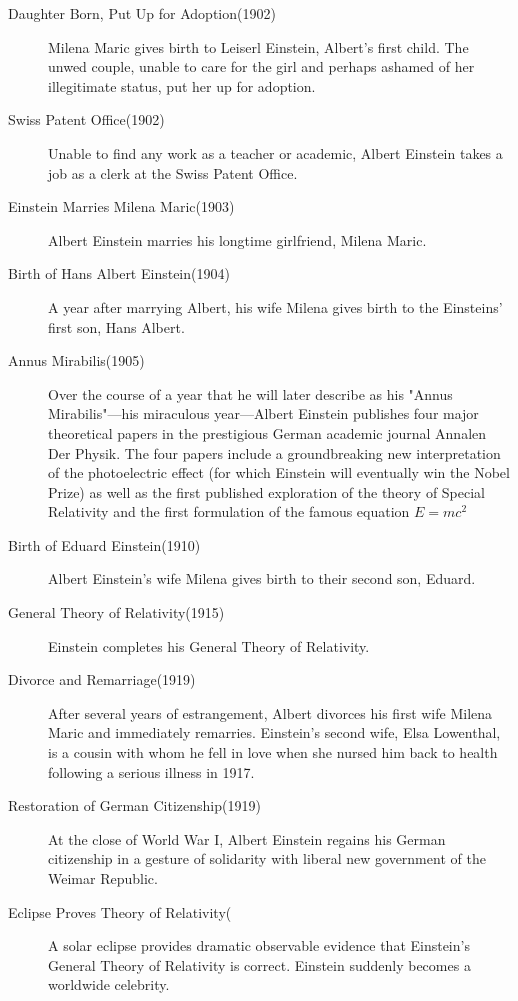 \documentclass{article}
\begin{document}
\begin{description}
\item[Daughter Born, Put Up for Adoption(1902)]
Milena Maric gives birth to Leiserl Einstein, Albert's first child. The unwed couple, unable to care for the girl and perhaps ashamed of her illegitimate status, put her up for adoption.

\item[Swiss Patent Office(1902)]
Unable to find any work as a teacher or academic, Albert Einstein takes a job as a clerk at the Swiss Patent Office.

\item[Einstein Marries Milena Maric(1903)]
Albert Einstein marries his longtime girlfriend, Milena Maric.

\item[Birth of Hans Albert Einstein(1904)]
A year after marrying Albert, his wife Milena gives birth to the Einsteins' first son, Hans Albert.

\item[Annus Mirabilis(1905)]
Over the course of a year that he will later describe as his "Annus Mirabilis"—his miraculous year—Albert Einstein publishes four major theoretical papers in the prestigious German academic journal Annalen Der Physik. The four papers include a groundbreaking new interpretation of the photoelectric effect (for which Einstein will eventually win the Nobel Prize) as well as the first published exploration of the theory of Special Relativity and the first formulation of the famous equation
$ E = mc^2 $


\item[Birth of Eduard Einstein(1910)]
Albert Einstein's wife Milena gives birth to their second son, Eduard.

\item[General Theory of Relativity(1915)]
Einstein completes his General Theory of Relativity.

\item[Divorce and Remarriage(1919)]
After several years of estrangement, Albert divorces his first wife Milena Maric and immediately remarries. Einstein's second wife, Elsa Lowenthal, is a cousin with whom he fell in love when she nursed him back to health following a serious illness in 1917.

\item[Restoration of German Citizenship(1919)]
At the close of World War I, Albert Einstein regains his German citizenship in a gesture of solidarity with liberal new government of the Weimar Republic.

\item[Eclipse Proves Theory of Relativity(\date{May 29, 1919})]
A solar eclipse provides dramatic observable evidence that Einstein's General Theory of Relativity is correct. Einstein suddenly becomes a worldwide celebrity.


\end{description}
\end{document}
